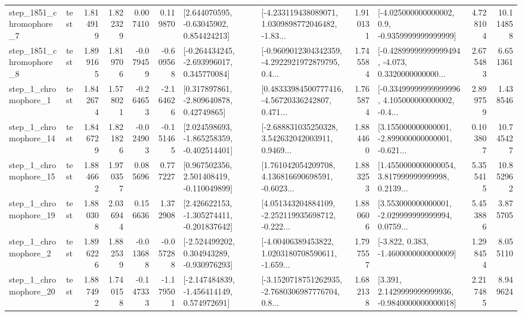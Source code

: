 \begin{tabular}{llrrrrllrlrr}
  step\_1851\_chromophore\_7 &      test &      1.814919 &    1.822329 &      0.007410 &  0.119870 &     [2.644070595, -0.63045902, 0.854424213] &  [-4.233119438089071, 1.0309898772046482, -1.83... &       1.910131 &     [-4.025000000000002, 0.9, -0.9359999999999999] &            4.728104 &         10.114858 \\
  step\_1851\_chromophore\_8 &      test &      1.899165 &    1.819706 &     -0.079459 & -0.609568 &   [-0.264434245, -2.693996017, 0.345770084] &  [-0.9609012304342359, -4.2922921972879795, 0.4... &       1.745584 &  [-0.42899999999999494, -4.073, 0.3320000000000... &            2.675483 &          6.651361 \\
     step\_1\_chromophore\_1 &      test &      1.842674 &    1.578021 &     -0.264653 & -2.164626 &     [0.317897861, -2.809640878, 0.42749865] &  [0.48333984500777416, -4.56720336242807, 0.471... &       1.765874 &  [-0.33499999999999996, 4.105000000000002, -0.4... &            2.899759 &          1.438546 \\
    step\_1\_chromophore\_14 &      test &      1.846729 &    1.821826 &     -0.024903 & -0.151465 &   [2.024598693, -1.865258359, -0.402514401] &  [-2.688831035250328, 3.542632042003911, 0.9469... &       1.884460 &  [3.155000000000001, -2.899000000000001, -0.621... &            0.103807 &         10.745427 \\
    step\_1\_chromophore\_15 &      test &      1.884662 &    1.970357 &      0.085696 &  0.777227 &    [0.967502356, 2.501408419, -0.110049899] &  [1.761042054209708, 4.136816690698591, -0.6023... &       1.883253 &  [1.4550000000000054, 3.817999999999998, 0.2139... &            5.355415 &         10.852962 \\
    step\_1\_chromophore\_19 &      test &      1.880308 &    2.036944 &      0.156636 &  1.372908 &   [2.426622153, -1.305274411, -0.201837642] &  [4.051343204884109, -2.252119935698712, -0.222... &       1.880606 &  [3.553000000000001, -2.029999999999994, 0.0759... &            5.453886 &          3.875705 \\
     step\_1\_chromophore\_2 &      test &      1.896226 &    1.882539 &     -0.013688 & -0.057288 &   [-2.524499202, 0.304943289, -0.930976293] &  [-4.00406389453822, 1.0203180708590611, -1.659... &       1.797557 &               [-3.822, 0.383, -1.4600000000000009] &            1.298454 &          8.055110 \\
    step\_1\_chromophore\_20 &      test &      1.887492 &    1.740158 &     -0.147333 & -1.179501 &   [-2.147484839, -1.456414149, 0.574972691] &  [-3.1520718751262935, -2.7680306987776704, 0.8... &       1.682138 &   [3.391, 2.1429999999999936, -0.9840000000000018] &            2.217485 &          8.949624 \\

\end{tabular}
